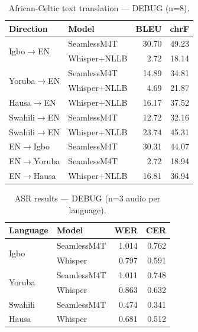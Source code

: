 
\begin{table}[t]
\centering
\small
\caption{African-Celtic text translation — DEBUG (n=8).}
\label{tab:debug_ac_text}
\begin{tabular}{llrr}
\toprule
\textbf{Direction} & \textbf{Model} & \textbf{BLEU} & \textbf{chrF} \\
\midrule
\multirow{2}{*}{Igbo$\to$EN}
  & SeamlessM4T  & 30.70 & 49.23 \\
  & Whisper+NLLB &  2.72 & 18.14 \\
\midrule
\multirow{2}{*}{Yoruba$\to$EN}
  & SeamlessM4T  & 14.89 & 34.81 \\
  & Whisper+NLLB &  4.69 & 21.87 \\
\midrule
Hausa$\to$EN   & Whisper+NLLB & 16.17 & 37.52 \\
Swahili$\to$EN & SeamlessM4T  & 12.72 & 32.16 \\
Swahili$\to$EN & Whisper+NLLB & 23.74 & 45.31 \\
EN$\to$Igbo    & SeamlessM4T  & 30.31 & 44.07 \\
EN$\to$Yoruba  & SeamlessM4T  &  2.72 & 18.94 \\
EN$\to$Hausa   & Whisper+NLLB & 16.81 & 36.94 \\
\bottomrule
\end{tabular}
\end{table}

\begin{table}[t]
\centering
\small
\caption{ASR results — DEBUG (n=3 audio per language).}
\label{tab:debug_asr}
\begin{tabular}{llrr}
\toprule
\textbf{Language} & \textbf{Model} & \textbf{WER} & \textbf{CER} \\
\midrule
\multirow{2}{*}{Igbo}
  & SeamlessM4T  & 1.014 & 0.762 \\
  & Whisper      & 0.797 & 0.591 \\
\midrule
\multirow{2}{*}{Yoruba}
  & SeamlessM4T  & 1.011 & 0.748 \\
  & Whisper      & 0.863 & 0.632 \\
\midrule
Swahili & SeamlessM4T & 0.474 & 0.341 \\
Hausa   & Whisper     & 0.681 & 0.512 \\
\bottomrule
\end{tabular}
\end{table}
